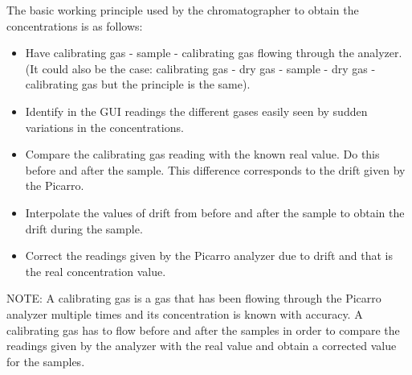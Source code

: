 The basic working principle used by the chromatographer to obtain the concentrations is as follows:
\begin{itemize}
    \item Have calibrating gas - sample - calibrating gas flowing through the analyzer. (It could also be the case: calibrating gas - dry gas - sample - dry gas - calibrating gas but the principle is the same). 
    \item Identify in the GUI readings the different gases easily seen by sudden variations in the concentrations. 
    \item Compare the calibrating gas reading with the known real value. Do this before and after the sample. This difference corresponds to the drift given by the Picarro. 
    \item Interpolate the values of drift from before and after the sample to obtain the drift during the sample. 
    \item Correct the readings given by the Picarro analyzer due to drift and that is the real concentration value. 
\end{itemize}

NOTE: A calibrating gas is a gas that has been flowing through the Picarro analyzer multiple times and its concentration is known with accuracy. A calibrating gas has to flow before and after the samples in order to compare the readings given by the analyzer with the real value and obtain a corrected value for the samples. 

